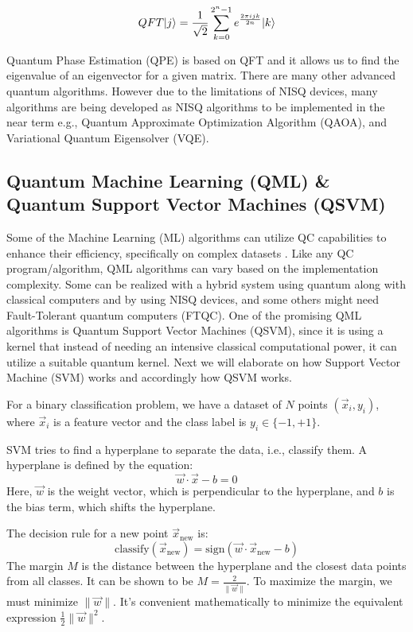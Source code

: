 \documentclass[12pt,a4paper]{article}
\DeclarePairedDelimiter\ket{\lvert}{\rangle}
\begin{document}
	\begin{equation}
		\label{eqn:equation2}
		QFT\ket{j} = \frac{1}{\sqrt{2}} \sum_{k=0}^{2^n-1} e^\frac{2\pi ijk}{2n} \ket{k}
	\end{equation}
	
	Quantum Phase Estimation (QPE) is based on QFT and it allows us to find the eigenvalue of an eigenvector for a given matrix. There are many other advanced quantum algorithms. However due to the limitations of NISQ devices, many algorithms are being developed as NISQ algorithms to be implemented in the near term e.g., Quantum Approximate Optimization Algorithm (QAOA), and Variational Quantum Eigensolver (VQE). 
	
	\subsection{Quantum Machine Learning (QML) \& Quantum Support Vector Machines (QSVM) }
	
	Some of the Machine Learning (ML) algorithms can utilize QC capabilities to enhance their efficiency, specifically on complex datasets \cite{electronics12112379} \cite{maouaki2024quantumsupportvectormachine}. Like any QC program/algorithm, QML algorithms can vary based on the implementation complexity. Some can be realized with a hybrid system using quantum along with classical computers and by using NISQ devices, and some others might need Fault-Tolerant quantum computers (FTQC). One of the promising QML algorithms is Quantum Support Vector Machines (QSVM), since it is using a kernel that instead of needing an intensive classical computational power, it can utilize a suitable quantum kernel. Next we will elaborate on how Support Vector Machine (SVM) works and accordingly how QSVM works.
	
	For a binary classification problem, we have a dataset of $N$ points $(\vec{x}_i, y_i)$, where $\vec{x}_i$ is a feature vector and the class label is $y_i \in \{-1, +1\}$.
	
	SVM tries to find a hyperplane to separate the data, i.e., classify them. A hyperplane is defined by the equation:
	\[
	\vec{w} \cdot \vec{x} - b = 0
	\]
	Here, $\vec{w}$ is the weight vector, which is perpendicular to the hyperplane, and $b$ is the bias term, which shifts the hyperplane.
	
	The decision rule for a new point $\vec{x}_{\text{new}}$ is:
	\[
	\text{classify}(\vec{x}_{\text{new}}) = \text{sign}(\vec{w} \cdot \vec{x}_{\text{new}} - b)
	\]
	The margin $M$ is the distance between the hyperplane and the closest data points from all classes. It can be shown to be $M = \frac{2}{\|\vec{w}\|}$. To maximize the margin, we must minimize $\|\vec{w}\|$. It's convenient mathematically to minimize the equivalent expression $\frac{1}{2}\|\vec{w}\|^2$.
	
\end{document}
